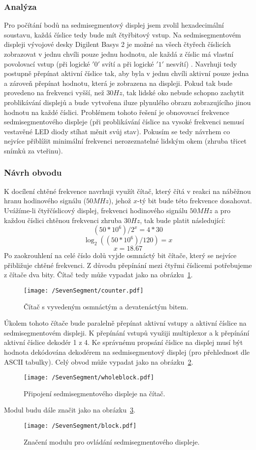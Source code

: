 \documentclass{report}
\begin{document}
\subsubsection{Analýza}
Pro počítání bodů na sedmisegmentový displej jsem zvolil hexadecimální soustavu, každá číslice tedy bude mít čtyřbitový vstup. Na sedmisegmentovém displeji vývojové desky Digilent Basys 2 je možné na všech čtyřech číslicích zobrazovat v jednu chvíli pouze jednu hodnotu, ale každá z číslic má vlastní povolovací vstup (při logické $'0'$ svítí a při logické $'1'$ nesvítí) . Navrhuji tedy postupně přepínat aktivní číslice tak, aby byla v jednu chvíli aktivní pouze jedna a zároveň přepínat hodnotu, která je zobrazena na displeji. Pokud tak bude provedeno na frekvenci vyšší, než $30Hz$, tak lidské oko nebude schopno zachytit problikávání displejů a bude vytvořena iluze plynulého obrazu zobrazujícího jinou hodnotu na každé číslici. Problémem tohoto řešení je obnovovací frekvence sedmisegmentového displeje (při problikávání číslice na vysoké frekvenci nemusí vestavěné LED diody stíhat měnit svůj stav). Pokusím se tedy návrhem co nejvíce přiblížit minimální frekvenci nerozeznatelné lidským okem (zhruba třicet snímků za vteřinu).
\subsubsection{Návrh obvodu}
K docílení chtěné frekvence navrhuji využít čítač, který čítá v reakci na náběžnou hranu hodinového signálu ($50MHz$), jehož $x$-tý bit bude této frekvence dosahovat. Uvážíme-li čtyřčíslicový displej, frekvenci hodinového signálu $50MHz$ a pro každou číslici chtěnou frekvenci zhruba $30Hz$, tak bude platit následující:
\[(50*10^6)/2^x=4*30\]
\[\log_2  ((50*10^6)/120) = x\]
\[x = 18.67\]
Po zaokrouhlení na celé číslo dolů vyjde osmnáctý bit čítače, který se nejvíce přibližuje chtěné frekvenci. Z důvodu přepínání mezi čtyřmi číslicemi potřebujeme z čítače dva bity. Čítač tedy může vypadat jako na obrázku~\ref{fig:sscounter}.
\begin{figure}
\centering
\texttt{[image: /SevenSegment/counter.pdf]}
\caption{Čítač s vyvedeným osmnáctým a devatenáctým bitem.}
\label{fig:sscounter}
\end{figure}
Úkolem tohoto čítače bude paralelně přepínat aktivní vstupy a aktivní číslice na sedmisegmentovém displeji. K přepínání vstupů využiji multiplexor a k přepínání aktivní číslice dekodér 1 z 4. Ke správnému propsání číslice na displej musí být hodnota dekódována dekodérem na sedmisegmentový displej (pro přehlednost dle ASCII tabulky). Celý obvod může vypadat jako na obrázku~\ref{fig:wholeblock}.
\begin{figure}
\centering
\texttt{[image: /SevenSegment/wholeblock.pdf]}
\caption{Připojení sedmisegmentového displeje na čítač.}
\label{fig:wholeblock}
\end{figure}
Modul budu dále značit jako na obrázku~\ref{fig:block}.
\begin{figure}
\centering
\texttt{[image: /SevenSegment/block.pdf]}
\caption{Značení modulu pro ovládání sedmisegmentového displeje.}
\label{fig:block}
\end{figure}
\end{document}
